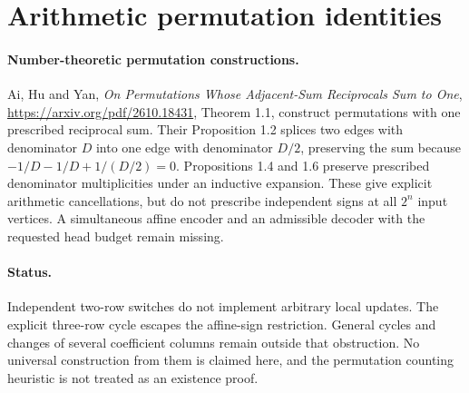 \documentclass[11pt]{article}
\begin{document}
\section{Arithmetic permutation identities}

\paragraph{Number-theoretic permutation constructions.}
Ai, Hu and Yan, \emph{On Permutations Whose Adjacent-Sum Reciprocals
Sum to One}, \url{https://arxiv.org/pdf/2610.18431}, Theorem 1.1,
construct permutations with one prescribed reciprocal sum. Their
Proposition 1.2 splices two edges with denominator $D$ into one edge
with denominator $D/2$, preserving the sum because
$-1/D-1/D+1/(D/2)=0$.
Propositions 1.4 and 1.6 preserve prescribed denominator multiplicities
under an inductive expansion. These give explicit arithmetic
cancellations, but do not prescribe independent signs at all $2^n$
input vertices. A simultaneous affine encoder and an admissible decoder
with the requested head budget remain missing.

\paragraph{Status.}
Independent two-row switches do not implement arbitrary local updates.
The explicit three-row cycle escapes the affine-sign restriction.
General cycles and changes of several coefficient columns remain
outside that obstruction. No universal construction from them is
claimed here, and the permutation counting heuristic is not treated
as an existence proof.
\end{document}
